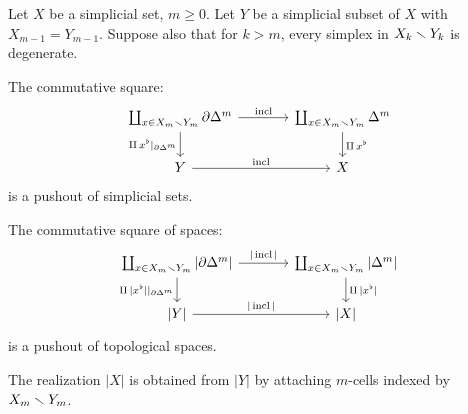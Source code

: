 \begin{proposition}\label{proposition:cw-structure-on-realization-preparation}
Let $X$ be a simplicial set, $m\ge0$. Let $Y$ be a simplicial subset of $X$ with $X_{m-1}=Y_{m-1}$. Suppose also that for $k>m$, every simplex in $X_k\smallsetminus Y_k$ is degenerate.
\begin{numerate}
\item The commutative square:
\[
\begin{tikzcd}[column sep=large]
\coprod_{x\in X_m\sm Y_m}\de\Delta^m \ar[d,"\amalg\,x^\flat|_{\de\Delta^m}"'] \ar[r,"\incl"] & \coprod_{x\in X_m\sm Y_m}\Delta^m \ar[d,"\amalg\,x^\flat"]\\
Y \ar[r,"\incl"] & X
\end{tikzcd}
\]
is a pushout of simplicial sets.
\item The commutative square of spaces:
\[
\begin{tikzcd}[column sep=large]
\coprod_{x\in X_m\sm Y_m}|\de\Delta^m| \ar[d,"\amalg\,|x^\flat||_{\de\Delta^m}"'] \ar[r,"|\incl|"] & \coprod_{x\in X_m\sm Y_m}|\Delta^m| \ar[d,"\amalg\,|x^\flat|"]\\
{|Y|} \ar[r,"|\incl|"] & {|X|}
\end{tikzcd}
\]
is a pushout of topological spaces.
\item The realization $|X|$ is obtained from $|Y|$ by attaching $m$-cells indexed by $X_m\smallsetminus Y_m$.
\end{numerate}
\end{proposition}

